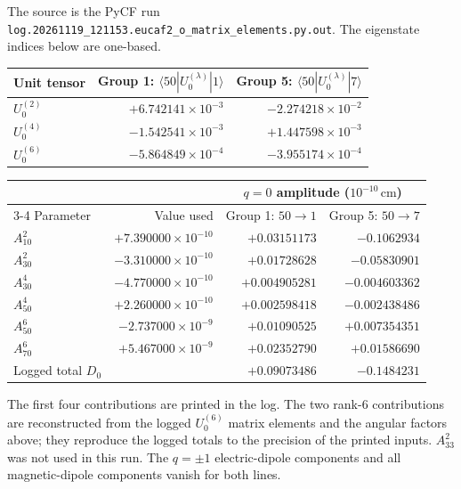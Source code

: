 \documentclass[11pt,a4paper]{article}
\begin{document}
The source is the PyCF run
\texttt{log.20261119\_121153.eucaf2\_o\_matrix\_elements.py.out}.
The eigenstate indices below are one-based.

\begin{center}
\begin{tabular}{lrr}
\toprule
Unit tensor & Group 1: \(\langle 50|U^{(\lambda)}_0|1\rangle\)
            & Group 5: \(\langle 50|U^{(\lambda)}_0|7\rangle\) \\
\midrule
\(U^{(2)}_0\) & \(+6.742141\times10^{-3}\) & \(-2.274218\times10^{-2}\) \\
\(U^{(4)}_0\) & \(-1.542541\times10^{-3}\) & \(+1.447598\times10^{-3}\) \\
\(U^{(6)}_0\) & \(-5.864849\times10^{-4}\) & \(-3.955174\times10^{-4}\) \\
\bottomrule
\end{tabular}
\end{center}

\begin{center}
\begin{tabular}{lrrr}
\toprule
 & & \multicolumn{2}{c}{\(q=0\) amplitude (\(10^{-10}\,\mathrm{cm}\))} \\
\cmidrule(l){3-4}
Parameter & Value used & Group 1: \(50\to1\) & Group 5: \(50\to7\) \\
\midrule
\(A^{2}_{10}\) & \(+7.390000\times10^{-10}\) & \(+0.03151173\)  & \(-0.1062934\) \\
\(A^{2}_{30}\) & \(-3.310000\times10^{-10}\) & \(+0.01728628\)  & \(-0.05830901\) \\
\(A^{4}_{30}\) & \(-4.770000\times10^{-10}\) & \(+0.004905281\) & \(-0.004603362\) \\
\(A^{4}_{50}\) & \(+2.260000\times10^{-10}\) & \(+0.002598418\) & \(-0.002438486\) \\
\(A^{6}_{50}\) & \(-2.737000\times10^{-9}\)  & \(+0.01090525\)  & \(+0.007354351\) \\
\(A^{6}_{70}\) & \(+5.467000\times10^{-9}\)  & \(+0.02352790\)  & \(+0.01586690\) \\
\midrule
Logged total \(D_0\) & & \(+0.09073486\) & \(-0.1484231\) \\
\bottomrule
\end{tabular}
\end{center}

The first four contributions are printed in the log. The two
rank-6 contributions are reconstructed from the logged \(U^{(6)}_0\)
matrix elements and the angular factors above; they reproduce the
logged totals to the precision of the printed inputs. \(A^{2}_{33}\)
was not used in this run. The \(q=\pm1\) electric-dipole components
and all magnetic-dipole components vanish for both lines.
\end{document}
